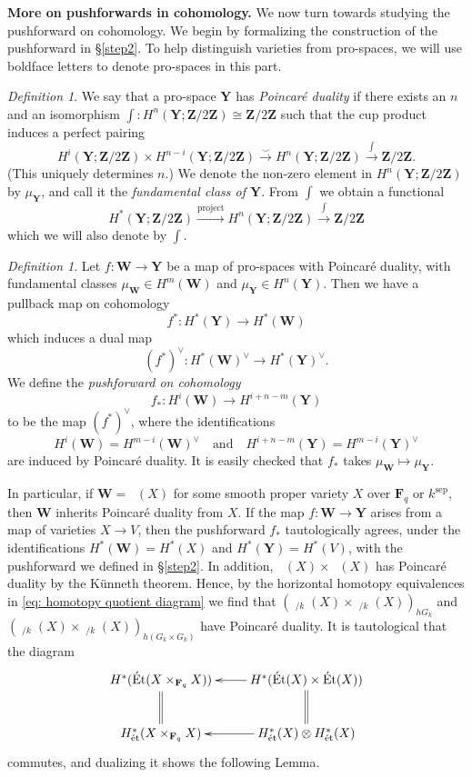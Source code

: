 \documentclass[10pt, reqno]{amsart}
\numberwithin{equation}{subsection}
\newcommand{\F}{\mathbf{F}}
\newcommand{\Z}{\mathbf{Z}}
\newcommand{\mbf}[1]{\mathbf{#1}}
\newcommand{\mrm}[1]{\mathrm{#1}}
\newcommand{\co}{\colon}
\DeclareMathOperator{\et}{\acute{e}t}
\DeclareMathOperator{\Et}{\acute{E}t}
\theoremstyle{remark}
\newtheorem{defn}[thm]{Definition}
\begin{document}
\noindent \textbf{More on pushforwards in cohomology.} We now turn towards studying the pushforward on cohomology. We begin by formalizing the construction of the pushforward in \S \ref{step2}. To help distinguish varieties from pro-spaces, we will use boldface letters to denote pro-spaces in this part. 

\begin{defn}
We say that a pro-space $\mbf{Y}$ has \emph{Poincar\'{e} duality} if there exists an $n$ and an isomorphism $\int \colon H^n(\mbf{Y}; \Z/2\Z) \cong \Z/2\Z$ such that the cup product induces a perfect pairing 
\[
H^i(\mbf{Y};\Z/2\Z) \times H^{n-i}(\mbf{Y};\Z/2\Z) \xrightarrow{\smile} H^n(\mbf{Y};\Z/2\Z) \xrightarrow{\int} \Z/2\Z.
\]
(This uniquely determines $n$.) We denote the non-zero element in $H^n(\mbf{Y}; \Z/2\Z)$ by $\mu_{\mbf{Y}}$, and call it the \emph{fundamental class of $\mbf{Y}$}. From $\int$ we obtain a functional 
\[
H^*(\mbf{Y}; \Z/2\Z) \xrightarrow{\mrm{project}} H^n(\mbf{Y}; \Z/2\Z)  \xrightarrow{\int} \Z/2\Z
\]
which we will also denote by $\int$. 
\end{defn}

\begin{defn}\label{push_by_duality}
Let $f \colon \mbf{W} \rightarrow \mbf{Y}$ be a map of pro-spaces with Poincar\'{e} duality, with fundamental classes $\mu_{\mbf{W}} \in H^m(\mbf{W})$ and $\mu_{\mbf{Y}} \in H^n(\mbf{Y})$. Then we have a pullback map on cohomology 
\[
f^* \colon H^*(\mbf{Y})  \rightarrow H^*(\mbf{W}) 
\]
which induces a dual map
\[
(f^*)^{\vee} \colon H^*(\mbf{W})^{\vee} \rightarrow H^*(\mbf{Y})^{\vee}.
\]
We define the  \emph{pushforward on cohomology} 
\[
f_* \colon H^i(\mbf{W}) \rightarrow H^{i+n-m}(\mbf{Y})
\]
to be the map $(f^*)^{\vee} $, where the identifications 
\[
 H^i(\mbf{W}) = H^{m-i}(\mbf{W})^{\vee} \quad \text{and} \quad  H^{i+n-m}(\mbf{Y})=	 H^{m-i}(\mbf{Y})^{\vee}
\]
are induced by Poincar\'{e} duality. It is easily checked that $f_*$ takes $\mu_{\mbf{W}}  \mapsto \mu_{\mbf{Y}}$. 

\end{defn}


In particular, if $\mbf{W}  =\Et(X)$ for some smooth proper variety $X$ over $\F_q$ or $k^{\mrm{sep}}$, then $\mbf{W}$ inherits Poincar\'{e} duality from $X$. If the map $f\co \mbf{W} \rightarrow \mbf{Y}$ arises from a map of varieties $X \rightarrow V$, then the pushforward $f_*$ tautologically agrees, under the identifications $H^*(\mbf{W}) = H^*_{\et}(X)$ and $H^*(\mbf{Y}) = H^*_{\et}(V)$, with the pushforward we defined in \S \ref{step2}. In addition, $\Et(X) \times  \Et(X)$ has Poincar\'{e} duality by the K\"{u}nneth theorem. Hence, by the horizontal homotopy equivalences in \eqref{eq: homotopy quotient diagram} we find that $(\Et_{/k}(X) \times \Et_{/k}(X))_{hG_k} $ and  $ (\Et_{/k}(X) \times \Et_{/k}(X))_{h(G_k \times G_k)} $ have Poincar\'{e} duality. It is tautological that the diagram 
\[
\xymatrix{
H^*(\Et(X \times_{\F_q} X)  )  \ar@{=}[d]& H^* (\Et(X) \times \Et(X)) \ar@{=}[d] \ar[l] \\
H^*_{\et}(X \times_{\F_q} X) & H^*_{\et}(X) \otimes H^*_{\et}(X) \ar[l]
}
\]
commutes, and dualizing it shows the following Lemma. 
\end{document}

